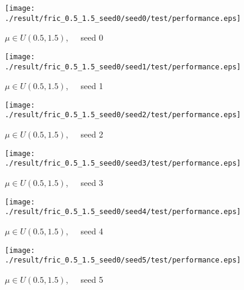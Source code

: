 \begin{figure}[p]
 \begin{minipage}{0.49\hsize}
  \begin{center}
 \texttt{[image: ./result/fric\_0.5\_1.5\_seed0/seed0/test/performance.eps]}
  \caption{$\mu\in U(0.5,1.5)$,~~~seed 0
  }
  \end{center}
 \end{minipage}
 \begin{minipage}{0.49\hsize}
   \begin{center}
 \texttt{[image: ./result/fric\_0.5\_1.5\_seed0/seed1/test/performance.eps]}
  \caption{$\mu\in U(0.5,1.5)$,~~~seed 1
  }
  \end{center}
 \end{minipage}
\end{figure}

\begin{figure}[p]
 \begin{minipage}{0.49\hsize}
  \begin{center}
 \texttt{[image: ./result/fric\_0.5\_1.5\_seed0/seed2/test/performance.eps]}
  \caption{$\mu\in U(0.5,1.5)$,~~~seed 2
  }
  \end{center}
 \end{minipage}
 \begin{minipage}{0.49\hsize}
   \begin{center}
 \texttt{[image: ./result/fric\_0.5\_1.5\_seed0/seed3/test/performance.eps]}
  \caption{$\mu\in U(0.5,1.5)$,~~~seed 3
  }
  \end{center}
 \end{minipage}
\end{figure}

\begin{figure}[p]
 \begin{minipage}{0.49\hsize}
  \begin{center}
 \texttt{[image: ./result/fric\_0.5\_1.5\_seed0/seed4/test/performance.eps]}
  \caption{$\mu\in U(0.5,1.5)$,~~~seed 4
  }
  \end{center}
 \end{minipage}
 \begin{minipage}{0.49\hsize}
   \begin{center}
 \texttt{[image: ./result/fric\_0.5\_1.5\_seed0/seed5/test/performance.eps]}
  \caption{$\mu\in U(0.5,1.5)$,~~~seed 5
  }
  \end{center}
 \end{minipage}
\end{figure}
